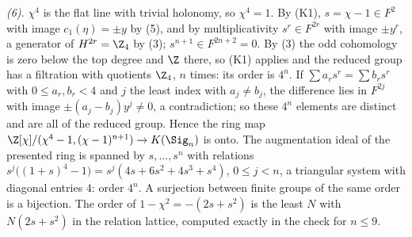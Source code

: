 \emph{(6).} $\chi^{4}$ is the flat line with trivial holonomy, so $\chi^{4} = 1$. By (K1), $s = \chi - 1 \in F^{2}$ with image $c_{1}(\eta) = \pm y$ by (5), and by multiplicativity $s^{r} \in F^{2r}$ with image $\pm y^{r}$, a generator of $H^{2r} = \Z_{4}$ by (3); $s^{n+1} \in F^{2n+2} = 0$. By (3) the odd cohomology is zero below the top degree and $\Z$ there, so (K1) applies and the reduced group has a filtration with quotients $\Z_{4}$, $n$ times: its order is $4^{n}$. If $\sum a_{r}s^{r} = \sum b_{r}s^{r}$ with $0 \leq a_{r}, b_{r} < 4$ and $j$ the least index with $a_{j} \neq b_{j}$, the difference lies in $F^{2j}$ with image $\pm(a_{j} - b_{j})y^{j} \neq 0$, a contradiction; so these $4^{n}$ elements are distinct and are all of the reduced group. Hence the ring map $\Z[\chi]/(\chi^{4} - 1, (\chi - 1)^{n+1}) \to K(\Sig_{n})$ is onto. The augmentation ideal of the presented ring is spanned by $s, \dots, s^{n}$ with relations $s^{j}\bigl((1+s)^{4} - 1\bigr) = s^{j}(4s + 6s^{2} + 4s^{3} + s^{4})$, $0 \leq j < n$, a triangular system with diagonal entries $4$: order $4^{n}$. A surjection between finite groups of the same order is a bijection. The order of $1 - \chi^{2} = -(2s + s^{2})$ is the least $N$ with $N(2s + s^{2})$ in the relation lattice, computed exactly in the check for $n \leq 9$.
